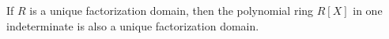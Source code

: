 If $R$ is a unique factorization domain, then the polynomial ring $R[X]$ in one indeterminate is also a unique factorization domain.

